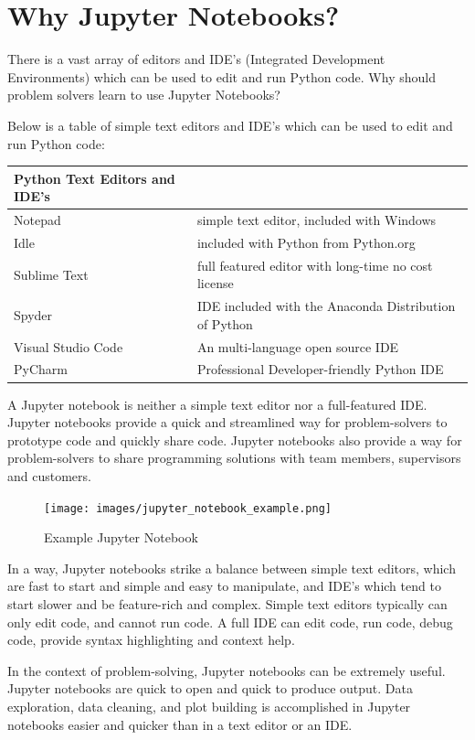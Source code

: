 \documentclass{book}
\begin{document}
    
        \section{Why Jupyter Notebooks?}\label{why-jupyter-notebooks}
    




    
        There is a vast array of editors and IDE's (Integrated Development
Environments) which can be used to edit and run Python code. Why should
problem solvers learn to use Jupyter Notebooks?

Below is a table of simple text editors and IDE's which can be used to
edit and run Python code:

\begin{longtable}[]{@{}ll@{}}
\toprule
Python Text Editors and IDE's &\tabularnewline
\midrule
\endhead
Notepad & simple text editor, included with Windows\tabularnewline
Idle & included with Python from Python.org\tabularnewline
Sublime Text & full featured editor with long-time no cost
license\tabularnewline
Spyder & IDE included with the Anaconda Distribution of
Python\tabularnewline
Visual Studio Code & An multi-language open source IDE\tabularnewline
PyCharm & Professional Developer-friendly Python IDE\tabularnewline
\bottomrule
\end{longtable}

A Jupyter notebook is neither a simple text editor nor a full-featured
IDE. Jupyter notebooks provide a quick and streamlined way for
problem-solvers to prototype code and quickly share code. Jupyter
notebooks also provide a way for problem-solvers to share programming
solutions with team members, supervisors and customers.

\begin{figure}
\centering
\texttt{[image: images/jupyter\_notebook\_example.png]}
\caption{Example Jupyter Notebook}
\end{figure}

In a way, Jupyter notebooks strike a balance between simple text
editors, which are fast to start and simple and easy to manipulate, and
IDE's which tend to start slower and be feature-rich and complex. Simple
text editors typically can only edit code, and cannot run code. A full
IDE can edit code, run code, debug code, provide syntax highlighting and
context help.
    




    
        In the context of problem-solving, Jupyter notebooks can be extremely
useful. Jupyter notebooks are quick to open and quick to produce output.
Data exploration, data cleaning, and plot building is accomplished in
Jupyter notebooks easier and quicker than in a text editor or an IDE.
\end{document}
